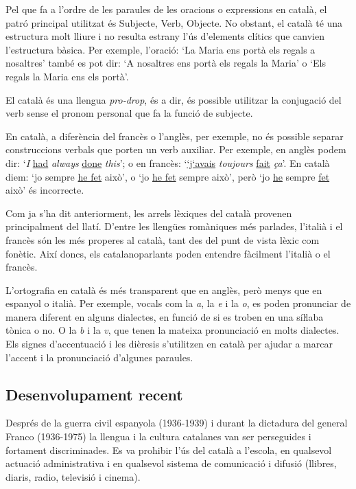 \begin{multicols}{2}
Pel que fa a l’ordre de les paraules de les oracions o expressions en català, el patró principal utilitzat és Subjecte, Verb, Objecte. No obstant, el català té una estructura molt lliure i no resulta estrany l’ús d’elements clítics que canvien l’estructura bàsica. Per exemple, l’oració: ‘La Maria ens portà els regals a nosaltres’ també es pot dir: ‘A nosaltres ens portà els regals la Maria’ o ‘Els regals la Maria ens els portà’.

El català és una llengua \textit{pro-drop}, és a dir, és possible utilitzar la conjugació del verb sense el pronom personal que fa la funció de subjecte. 

En català, a diferència del francès o l’anglès, per exemple, no és possible separar construccions verbals que porten un verb auxiliar. Per exemple, en anglès podem dir: ‘\textit{I} \underline{had} \textit{always} \underline{done} \textit{this}’; o en francès: ‘\underline{‘j‘avais} \textit{toujours} \underline{fait}  \textit{ça}’. En català diem: ‘jo sempre \underline{he fet} això’, o ‘jo \underline{he fet} sempre això’, però ‘jo \underline{he} sempre \underline{fet} això’ és incorrecte.

Com ja s’ha dit anteriorment, les arrels lèxiques del català provenen principalment del llatí. D’entre les llengües romàniques més parlades, l’italià i el francès són les més properes al català, tant des del punt de vista lèxic com fonètic. Així doncs, els catalanoparlants poden entendre fàcilment l’italià o el francès. 

L’ortografia en català és més transparent que en anglès, però menys que en espanyol o italià. Per exemple, vocals com la \textit{a}, la \textit{e} i la \textit{o}, es poden pronunciar de manera diferent en alguns dialectes, en funció de si es troben en una síŀlaba tònica o no. O la \textit{b} i la \textit{v}, que tenen la mateixa pronunciació en molts dialectes. Els signes d’accentuació i les dièresis s’utilitzen en català per ajudar a marcar l’accent i la pronunciació d’algunes paraules.

\subsection{Desenvolupament recent}

Després de la guerra civil espanyola (1936-1939) i durant la dictadura del general Franco (1936-1975) la llengua i la cultura catalanes van ser perseguides i fortament discriminades. Es va prohibir l’ús del català a l’escola, en qualsevol actuació administrativa i en qualsevol sistema de comunicació i difusió (llibres, diaris, radio, televisió i cinema).


\end{multicols}
